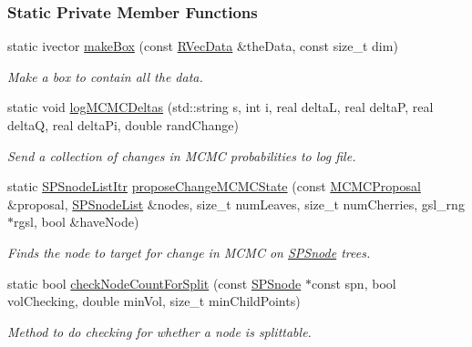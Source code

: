 \subsubsection*{\-Static \-Private \-Member \-Functions}
\begin{DoxyCompactItemize}
\item 
static ivector \hyperlink{classsubpavings_1_1AdaptiveHistogram_a4e40497a24ce0807235196e17ca21456}{make\-Box} (const \hyperlink{namespacesubpavings_a30e15e24c8d81a2160d7422ef3c39d68}{\-R\-Vec\-Data} \&the\-Data, const size\-\_\-t dim)
\begin{DoxyCompactList}\small\item\em \-Make a box to contain all the data. \end{DoxyCompactList}\item 
static void \hyperlink{classsubpavings_1_1AdaptiveHistogram_aedb9ab3c2240403c63f2f5c1d0218350}{log\-M\-C\-M\-C\-Deltas} (std\-::string s, int i, real delta\-L, real delta\-P, real delta\-Q, real delta\-Pi, double rand\-Change)
\begin{DoxyCompactList}\small\item\em \-Send a collection of changes in \-M\-C\-M\-C probabilities to log file. \end{DoxyCompactList}\item 
static \hyperlink{namespacesubpavings_a984883a654b8d040041f722f8ead7dc2}{\-S\-P\-Snode\-List\-Itr} \hyperlink{classsubpavings_1_1AdaptiveHistogram_ae7f23176e9afea24c51c6a37cbcc4b0a}{propose\-Change\-M\-C\-M\-C\-State} (const \hyperlink{classsubpavings_1_1MCMCProposal}{\-M\-C\-M\-C\-Proposal} \&proposal, \hyperlink{namespacesubpavings_ae7645253328c3b5fc137829039d971e3}{\-S\-P\-Snode\-List} \&nodes, size\-\_\-t num\-Leaves, size\-\_\-t num\-Cherries, gsl\-\_\-rng $\ast$rgsl, bool \&have\-Node)
\begin{DoxyCompactList}\small\item\em \-Finds the node to target for change in \-M\-C\-M\-C on \hyperlink{classsubpavings_1_1SPSnode}{\-S\-P\-Snode} trees. \end{DoxyCompactList}\item 
static bool \hyperlink{classsubpavings_1_1AdaptiveHistogram_a8a997f746bf62c847990542daf7c5a6a}{check\-Node\-Count\-For\-Split} (const \hyperlink{classsubpavings_1_1SPSnode}{\-S\-P\-Snode} $\ast$const spn, bool vol\-Checking, double min\-Vol, size\-\_\-t min\-Child\-Points)
\begin{DoxyCompactList}\small\item\em \-Method to do checking for whether a node is splittable. \end{DoxyCompactList}\end{DoxyCompactItemize}

